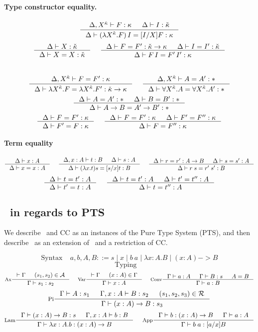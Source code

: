 \paragraph{Type constructor equality.}
\[ \inference{\Delta,X^\ka |- F:\kappa & \Delta |- I:\ka}
             {\Delta |- (\lambda X^\ka.F)\,I = [I/X]F:\kappa}
\]
\[ \inference{\Delta |- X:\ka }{\Delta |- X=X:\ka}
 ~~~~
   \inference{\Delta |- F=F':\ka->\kappa & \Delta |- I=I':\ka}
             {\Delta |- F\,I = F'\,I' : \kappa}
\]
 ~~~~
\[ \inference{\Delta,X^\ka |- F=F' : \kappa}
             {\Delta |- \lambda X^\ka.F=\lambda X^\ka.F' : \ka->\kappa}
 ~~~~
   \inference{\Delta,X^\ka |- A=A':*}
             {\Delta |- \forall X^\ka.A=\forall X^\ka.A':*}
\]
\[ \inference{\Delta |- A=A':* & \Delta |- B=B':*}{\Delta |- A-> B=A'-> B':*}
\]
\[ \inference{\Delta |- F = F' : \kappa}{\Delta |- F' = F : \kappa}
 ~~~~
   \inference{\Delta |- F = F' : \kappa & \Delta |- F' = F'' : \kappa}
             {\Delta |- F = F'' : \kappa}
\]

\paragraph{Term equality}
\[ \inference{\Delta |- x:A}{\Delta |- x=x:A}
 ~~~~
   \inference{\Delta,x:A |- t:B & \Delta |- s:A}
             {\Delta |- (\lambda x.t)s=[s/x]t : B}
 ~~~~
   \inference{\Delta |- r=r':A-> B & \Delta |- s=s':A}{\Delta |- r\;s=r'\;s':B}
\]
\[ \inference{\Delta |- t=t':A}{\Delta |- t'=t:A}
 ~~~~
   \inference{\Delta |- t=t':A & \Delta |- t'=t'':A}{\Delta |- t=t'':A}
\]








\subsection{\Fi\ in regards to PTS}
We describe \Fw\ and CC as an instances of the Pure Type System (PTS),
and then describe \Fi\ as an extension of \Fw\ and a restriction of CC.

\[\text{Syntax}~~~~~ a,b,A,B ::= s \mid x \mid b~a \mid \lambda x:A.B
                                   \mid (x:A) -> B \]
\[\text{Typing}~~~~~\]
\[
 \inference[Ax]{|-\Gamma & (s_1,s_2)\in\calA}{\Gamma |- s_1 : s_2}
 ~~~~
 \inference[Var]{|-\Gamma & (x:A)\in\Gamma}{\Gamma |- x:A} 
 ~~~~
 \inference[Conv]{\Gamma |- a:A & \Gamma |- B:s & A=B}{\Gamma |- a:B}
\]
\[
 \inference[Pi]{\Gamma |- A:s_1 & \Gamma,x:A |- B:s_2 & (s_1,s_2,s_3)\in\calR}
               {\Gamma |- (x:A)-> B : s_3}
\]
\[
 \inference[Lam]{\Gamma |- (x:A)-> B : s & \Gamma,x:A |- b:B}
                {\Gamma |- \lambda x:A.b : (x:A)-> B}
 ~~~~
 \inference[App]{\Gamma |- b:(x:A)-> B & \Gamma |- a:A}{\Gamma |- b\;a:[a/x]B}
\]

